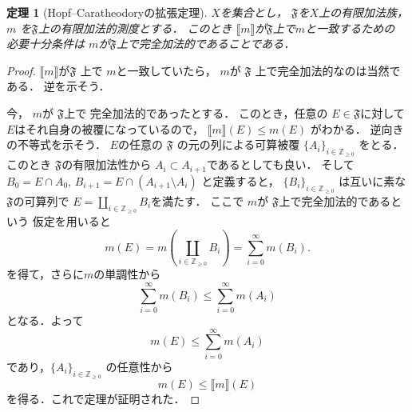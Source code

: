 \documentclass[leqno, a4paper, 12pt]{jsarticle}
\newtheorem{thm}{定理}
\newcommand{\zz}{\mathbb{Z}}
\newcommand{\mappa}[1]{\mathord{\llbracket #1\rrbracket}}
\begin{document}
\begin{thm}[Hopf--Caratheodoryの拡張定理]\label{thm:hcthm}
$X$を集合とし，
$\mathfrak{F}$を$X$上の有限加法族，$m$
を$\mathfrak{F}$上の有限加法的測度とする．
このとき
$\mappa{m}$が$\mathfrak{F}$上で$m$と一致するための
必要十分条件は
$m$が$\mathfrak{F}$上で完全加法的であることである．
\end{thm}
\begin{proof}
$\mappa{m}$が$\mathfrak{F}$
上で
$m$と一致していたら，
$m$が
$\mathfrak{F}$
上で完全加法的なのは当然である．
逆を示そう．

今，
$m$が
$\mathfrak{F}$上で
完全加法的であったとする．
このとき，任意の
$E\in \mathfrak{F}$に対して
$E$はそれ自身の被覆になっているので，
$\mappa{m}(E)\le m(E)$
がわかる．
逆向きの不等式を示そう．
$E$の任意の
$\mathfrak{F}$
の元の列による可算被覆
$\{A_{i}\}_{i\in \zz_{\ge 0}}$
をとる．このとき
$\mathfrak{F}$の有限加法性から
$A_{i}\subset A_{i+1}$であるとしても良い．
そして
$B_{0}=E\cap A_{0}$, $B_{i+1}=
E\cap (A_{i+1}\setminus A_{i})$
と定義すると，
$\{B_{i}\}_{i\in \zz_{\ge 0}}$
は互いに素な
$\mathfrak{F}$の可算列で
$E=\coprod_{i\in \zz_{\ge0}}B_{i}$を満たす．
ここで
$m$が
$\mathfrak{F}$上で完全加法的であるという
仮定を用いると
\[
m(E)=m\left(
\coprod_{i\in \zz_{\ge0}}B_{i}
\right)
=
\sum_{i=0}^{\infty}m(B_{i}). 
\]
を得て，さらに$m$の単調性から
\[
\sum_{i=0}^{\infty}m(B_{i})\le 
\sum_{i=0}^{\infty}m(A_{i})
\]
となる．よって
\[
m(E)\le \sum_{i=0}^{\infty}m(A_{i})
\]
であり，$\{A_{i}\}_{i\in \zz_{\ge 0}}$
の任意性から
\[
m(E)\le \mappa{m}(E)
\]
を得る．これで定理が証明された．
\end{proof}
\end{document}
